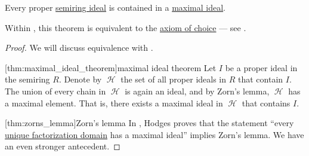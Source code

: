 \begin{theorem}\label{thm:maximal_ideal_theorem}
  Every proper \hyperref[def:semiring_ideal]{semiring ideal} is contained in a \hyperref[def:semiring_ideal/maximal]{maximal ideal}.

  Within \hyperref[def:zfc]{}, this theorem is equivalent to the \hyperref[def:zfc/choice]{axiom of choice} --- see .
\end{theorem}
\begin{proof}
  We will discuss equivalence with .

  [thm:maximal_ideal_theorem]{maximal ideal theorem} Let \( I \) be a proper ideal in the semiring \( R \). Denote by \( \mscrH \) the set of all proper ideals in \( R \) that contain \( I \). The union of every chain in \( \mscrH \) is again an ideal, and by Zorn's lemma, \( \mscrH \) has a maximal element. That is, there exists a maximal ideal in \( \mscrH \) that contains \( I \).

  [thm:zorns_lemma]{Zorn's lemma} In \cite{Hodges1979}, Hodges proves that the statement \enquote{every \hyperref[def:unique_factorization_domain]{unique factorization domain} has a maximal ideal} implies Zorn's lemma. We have an even stronger antecedent.
\end{proof}


